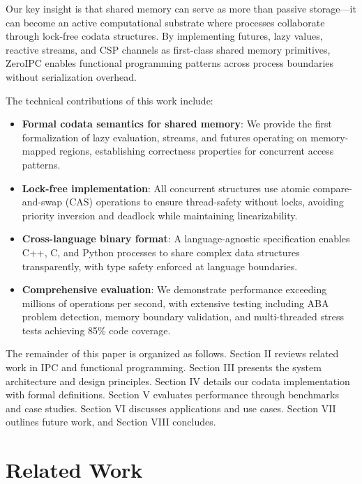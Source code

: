 \documentclass[10pt,conference]{IEEEtran}
\begin{document}
Our key insight is that shared memory can serve as more than passive storage---it can become an active computational substrate where processes collaborate through lock-free codata structures. By implementing futures, lazy values, reactive streams, and CSP channels as first-class shared memory primitives, ZeroIPC enables functional programming patterns across process boundaries without serialization overhead.

The technical contributions of this work include:

\begin{itemize}
\item \textbf{Formal codata semantics for shared memory}: We provide the first formalization of lazy evaluation, streams, and futures operating on memory-mapped regions, establishing correctness properties for concurrent access patterns.

\item \textbf{Lock-free implementation}: All concurrent structures use atomic compare-and-swap (CAS) operations to ensure thread-safety without locks, avoiding priority inversion and deadlock while maintaining linearizability.

\item \textbf{Cross-language binary format}: A language-agnostic specification enables C++, C, and Python processes to share complex data structures transparently, with type safety enforced at language boundaries.

\item \textbf{Comprehensive evaluation}: We demonstrate performance exceeding millions of operations per second, with extensive testing including ABA problem detection, memory boundary validation, and multi-threaded stress tests achieving 85\% code coverage.
\end{itemize}

The remainder of this paper is organized as follows. Section II reviews related work in IPC and functional programming. Section III presents the system architecture and design principles. Section IV details our codata implementation with formal definitions. Section V evaluates performance through benchmarks and case studies. Section VI discusses applications and use cases. Section VII outlines future work, and Section VIII concludes.

\section{Related Work}
\end{document}

